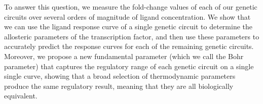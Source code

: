 
To answer this question, we measure the fold-change values of each of our genetic circuits over several orders of magnitude of ligand concentration. We show that we can use the ligand response curve of a single genetic circuit to determine the allosteric parameters of the transcription factor, and then use these parameters to accurately predict the response curves for each of the remaining genetic circuits. Moreover, we propose a new fundamental parameter (which we call the Bohr parameter) that captures the regulatory range of each genetic circuit on a single single curve, showing that a broad selection of thermodynamic parameters produce the same regulatory result, meaning that they are all biologically equivalent. 

